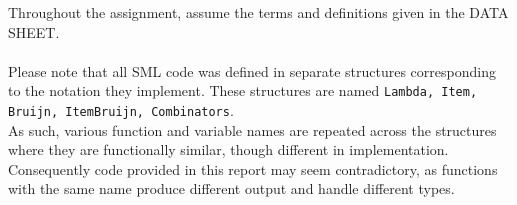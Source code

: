 \documentclass[11pt]{article}
\begin{document}
\maketitle


Throughout the assignment, assume the terms and definitions given in the DATA SHEET.
\\
\\
Please note that all SML code was defined in separate structures corresponding to the notation they implement. These structures are named \texttt{Lambda, Item, Bruijn, ItemBruijn, Combinators}. \\
As such, various function and variable names are repeated across the structures where they are functionally similar, though different in implementation. Consequently code provided in this report may seem contradictory, as functions with the same name produce different output and handle different types.
\end{document}
